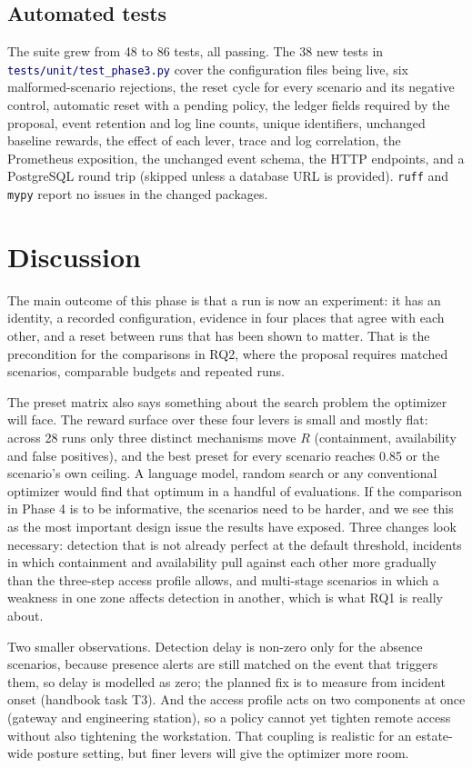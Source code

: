 \documentclass[11pt]{article}
\newcommand{\code}[1]{\texttt{\small #1}}
\newcommand{\file}[1]{\textcolor{navy}{\texttt{\small #1}}}
\begin{document}
\subsection{Automated tests}
The suite grew from 48 to 86 tests, all passing. The 38 new tests in
\file{tests/unit/test\_phase3.py} cover the configuration files being live, six
malformed-scenario rejections, the reset cycle for every scenario and its negative
control, automatic reset with a pending policy, the ledger fields required by the
proposal, event retention and log line counts, unique identifiers, unchanged
baseline rewards, the effect of each lever, trace and log correlation, the
Prometheus exposition, the unchanged event schema, the HTTP endpoints, and a
PostgreSQL round trip (skipped unless a database URL is provided). \code{ruff} and
\code{mypy} report no issues in the changed packages.

\section{Discussion}
\label{sec:discussion}
The main outcome of this phase is that a run is now an experiment: it has an
identity, a recorded configuration, evidence in four places that agree with each
other, and a reset between runs that has been shown to matter. That is the
precondition for the comparisons in RQ2, where the proposal requires matched
scenarios, comparable budgets and repeated runs.

The preset matrix also says something about the search problem the optimizer will
face. The reward surface over these four levers is small and mostly flat: across
28 runs only three distinct mechanisms move $R$ (containment, availability and
false positives), and the best preset for every scenario reaches 0.85 or the
scenario's own ceiling. A language model, random search or any conventional
optimizer would find that optimum in a handful of evaluations. If the comparison
in Phase 4 is to be informative, the scenarios need to be harder, and we see this
as the most important design issue the results have exposed. Three changes look
necessary: detection that is not already perfect at the default threshold,
incidents in which containment and availability pull against each other more
gradually than the three-step access profile allows, and multi-stage scenarios in
which a weakness in one zone affects detection in another, which is what RQ1 is
really about.

Two smaller observations. Detection delay is non-zero only for the absence
scenarios, because presence alerts are still matched on the event that triggers
them, so delay is modelled as zero; the planned fix is to measure from incident
onset (handbook task T3). And the access profile acts on two components at once
(gateway and engineering station), so a policy cannot yet tighten remote access
without also tightening the workstation. That coupling is realistic for an
estate-wide posture setting, but finer levers will give the optimizer more room.
\end{document}
